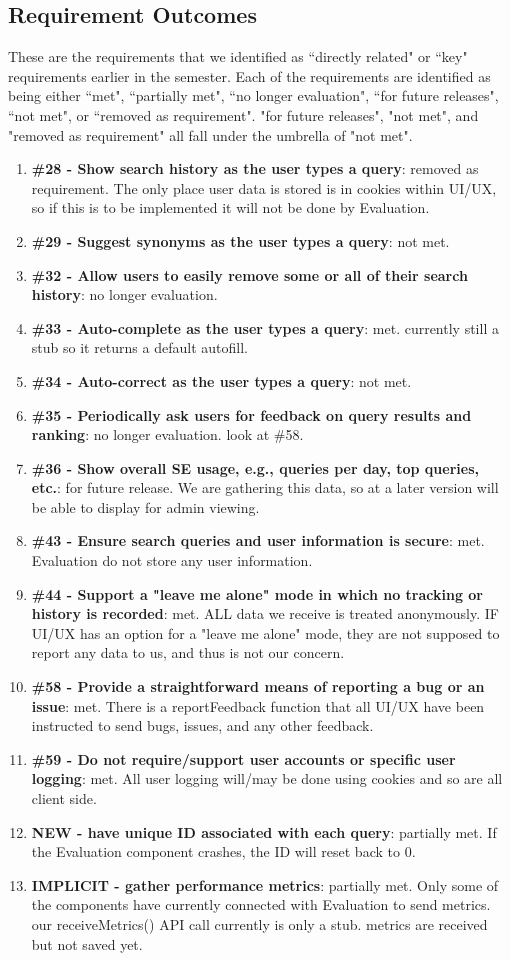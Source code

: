 \smallskip\subsection*{Requirement Outcomes}
These are the requirements that we identified as ``directly related" or ``key" requirements earlier in the semester. Each of the requirements are identified as being either ``met", ``partially met", ``no longer evaluation", ``for future releases", ``not met", or ``removed as requirement". 
\smallbreak
"for future releases", "not met", and "removed as requirement" all fall under the umbrella of "not met". 
\begin{enumerate}
\item \textbf{\#28 - Show search history as the user types a query}: removed as requirement. The only place user data is stored is in cookies within UI/UX, so if this is to be implemented it will not be done by Evaluation. 
\item \textbf{\#29 - Suggest synonyms as the user types a query}: not met. 
\item \textbf{\#32 - Allow users to easily remove some or all of their search history}: no longer evaluation.
\item \textbf{\#33 - Auto-complete as the user types a query}: met. currently still a stub so it returns a default autofill.
\item \textbf{\#34 - Auto-correct as the user types a query}: not met.
\item \textbf{\#35 - Periodically ask users for feedback on query results and ranking}: no longer evaluation. look at \#58.
\item \textbf{\#36 - Show overall SE usage, e.g., queries per day, top queries, etc.}: for future release. We are gathering this data, so at a later version will be able to display for admin viewing.
\item \textbf{\#43 - Ensure search queries and user information is secure}: met. Evaluation do not store any user information.
\item \textbf{\#44 - Support a "leave me alone" mode in which no tracking or history is recorded}: met. ALL data we receive is treated anonymously. IF UI/UX has an option for a "leave me alone" mode, they are not supposed to report any data to us, and thus is not our concern.
\item \textbf{\#58 - Provide a straightforward means of reporting a bug or an issue}: met. There is a reportFeedback function that all UI/UX have been instructed to send bugs, issues, and any other feedback. 
\item \textbf{\#59 - Do not require/support user accounts or specific user logging}: met. All user logging will/may be done using cookies and so are all client side.
\item \textbf{NEW - have unique ID associated with each query}: partially met. If the Evaluation component crashes, the ID will reset back to 0.
\item \textbf{IMPLICIT - gather performance metrics}: partially met. Only some of the components have currently connected with Evaluation to send metrics. our receiveMetrics() API call currently is only a stub. metrics are received but not saved yet. 
\end{enumerate}

